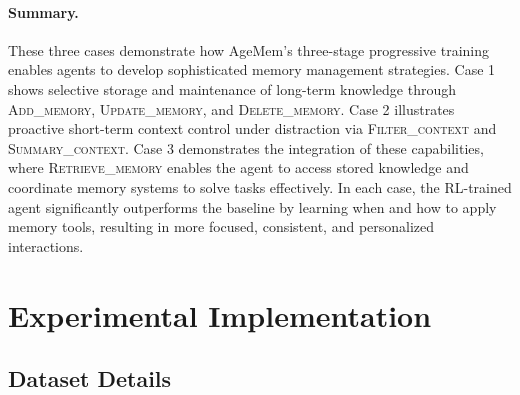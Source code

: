 \paragraph{Summary.}
These three cases demonstrate how AgeMem's three-stage progressive training enables agents to develop sophisticated memory management strategies. Case 1 shows selective storage and maintenance of long-term knowledge through \textsc{Add\_memory}, \textsc{Update\_memory}, and \textsc{Delete\_memory}. Case 2 illustrates proactive short-term context control under distraction via \textsc{Filter\_context} and \textsc{Summary\_context}. Case 3 demonstrates the integration of these capabilities, where \textsc{Retrieve\_memory} enables the agent to access stored knowledge and coordinate memory systems to solve tasks effectively. In each case, the RL-trained agent significantly outperforms the baseline by learning when and how to apply memory tools, resulting in more focused, consistent, and personalized interactions.


\section{Experimental Implementation}
\label{app:eimp}
\subsection{Dataset Details}
\label{app:datasets}

